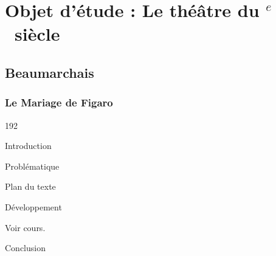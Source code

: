 \documentclass[12pt,a4paper]{article}
\begin{document}
 \newpage

		\section[La com\'edie du valet]{Objet d'\'etude : Le th\'e\^atre du \textsc{}$^{e}$~siècle}
			\subsection{Beaumarchais}
				\subsubsection{Le Mariage de Figaro}
\begin{dingautolist}{192}

\item Introduction \par
\item Probl\'ematique \par
\item Plan du texte \par
\item D\'eveloppement \par
        Voir cours.

\item Conclusion \par

\end{dingautolist}		
 \newpage
\end{document}
